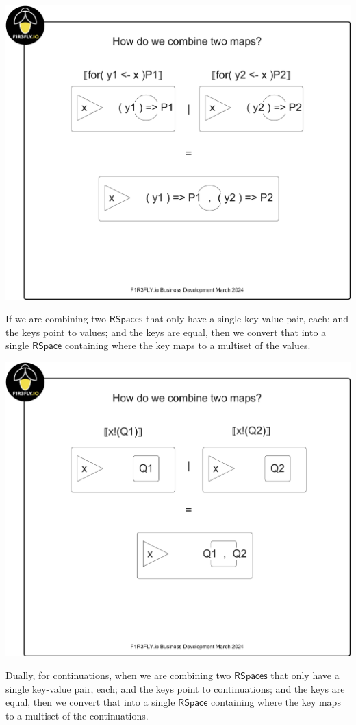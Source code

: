 \includegraphics[scale=0.25]{RHO20RSpaceSlide4.pdf}

If we are combining two $\mathsf{RSpaces}$ that only have a single
key-value pair, each; and the keys point to values; and the
keys are equal, then we convert that into a single $\mathsf{RSpace}$
containing where the key maps to a multiset of the values. 

\includegraphics[scale=0.25]{RHO20RSpaceSlide5.pdf}

Dually, for continuations, when we are combining two
$\mathsf{RSpaces}$ that only have a single key-value pair, each; and
the keys point to continuations; and the keys are equal, then we
convert that into a single $\mathsf{RSpace}$ containing where the key
maps to a multiset of the continuations.

